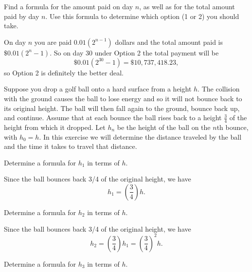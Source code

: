 \begin{exercises}
    \item Find a formula for the amount paid on day $n$, as well as for the total amount paid by day $n$. Use this formula to determine which option (1 or 2) you should take.

\begin{exerciseSolution}

On day $n$ you are paid $0.01\left(2^{n-1}\right)$ dollars and the total amount paid is $\$0.01\left(2^n-1\right)$. So on day 30 under Option 2 the total payment will be
\[\$0.01\left(2^{30}-1\right) = \$10,737,418.23,\]
so Option 2 is definitely the better deal.

\end{exerciseSolution}



\ea

\item  Suppose you drop a golf ball onto a hard surface from a height $h$. The collision with the ground causes the ball to lose energy and so it will not bounce back to its original height. The ball will then fall again to the ground, bounce back up, and continue. Assume that at each bounce the ball rises back to a height $\frac{3}{4}$ of the height from which it dropped. Let $h_n$ be the height of the ball on the $n$th bounce, with $h_0 = h$. In this exercise we will determine the distance traveled by the ball and the time it takes to travel that distance.

\ba
\item Determine a formula for $h_1$ in terms of $h$.

\begin{exerciseSolution}

Since the ball bounces back 3/4 of the original height, we have
\[h_1 = \left(\frac{3}{4}\right)h.\]

\end{exerciseSolution}

\item Determine a formula for $h_2$ in terms of $h$.

\begin{exerciseSolution}

Since the ball bounces back 3/4 of the original height, we have
\[h_2 = \left(\frac{3}{4}\right)h_1 = \left(\frac{3}{4}\right)^2h.\]

\end{exerciseSolution}

\item Determine a formula for $h_3$ in terms of $h$.


\end{exercises}
